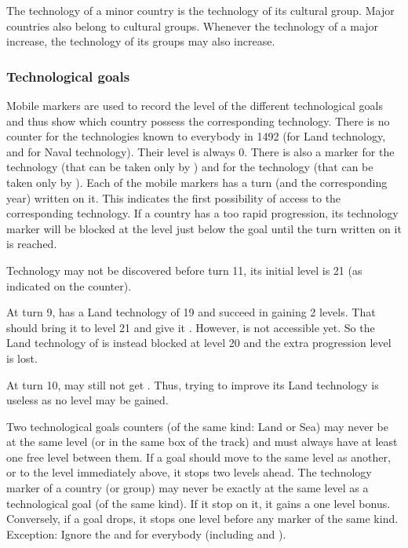  The technology of a minor country is the technology
of its cultural group.
\bparag Major countries also belong to cultural groups. Whenever the
technology of a major increase, the technology of its groups may also
increase.


\subsubsection{Technological goals}
 Mobile markers are used to record the level of the
different technological goals and thus show which country possess the
corresponding technology.
\bparag There is no counter for the technologies known to everybody in 1492
(\TMED for Land technology, \TCAR and \TGA for Naval technology). Their level
is always 0.
\bparag There is also a marker for the \TTER technology (that can be taken
only by \SPA) and for the \TVGA technology (that can be taken only by \VEN).
\bparag Each of the mobile markers has a turn (and the corresponding year)
written on it. This indicates the first possibility of access to the
corresponding technology.
\bparag If a country has a too rapid progression, its technology marker will
be blocked at the level just below the goal until the turn written on it is
reached.

\begin{exemple}
  Technology \TARQ may not be discovered before turn 11, its initial level is
  21 (as indicated on the counter).

  At turn 9, \FRA has a Land technology of 19 and succeed in gaining 2
  levels. That should bring it to level 21 and give it \TARQ. However, \TARQ
  is not accessible yet. So the Land technology of \FRA is instead blocked at
  level 20 and the extra progression level is lost.

  At turn 10, \FRA may still not get \TARQ. Thus, trying to improve its Land
  technology is useless as no level may be gained.
\end{exemple}

 Two technological goals counters (of the same
kind: Land or Sea) may never be at the same level (or in the same box of the
track) and must always have at least one free level between them. If a goal
should move to the same level as another, or to the level immediately above,
it stops two levels ahead.
\bparag The technology marker of a country (or group) may never be exactly at
the same level as a technological goal (of the same kind). If it stop on it,
it gains a one level bonus. Conversely, if a goal drops, it stops one level
before any marker of the same kind.
\bparag Exception: Ignore the \TTER and \TVGA for everybody (including \SPA
and \VEN).

